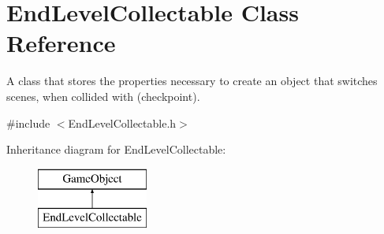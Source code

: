 \hypertarget{class_end_level_collectable}{}\section{End\+Level\+Collectable Class Reference}
\label{class_end_level_collectable}


A class that stores the properties necessary to create an object that switches scenes, when collided with (checkpoint).  




{\ttfamily \#include $<$End\+Level\+Collectable.\+h$>$}

Inheritance diagram for End\+Level\+Collectable\+:\begin{figure}[H]
\begin{center}
\leavevmode
\includegraphics[height=2.000000cm]{class_end_level_collectable}
\end{center}
\end{figure}
